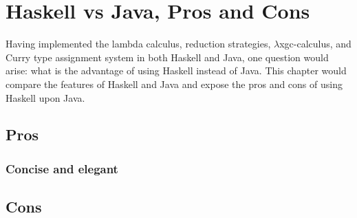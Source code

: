 \chapter{Haskell vs Java, Pros and Cons}

Having implemented the lambda calculus, reduction strategies, $\lambda$xgc-calculus, and Curry type assignment system in both Haskell and Java, one question would arise: what is the advantage of using Haskell instead of Java. This chapter would compare the features of Haskell and Java and expose the pros and cons of using Haskell upon Java. 

\section{Pros}
\subsection{Concise and elegant}



\section{Cons}